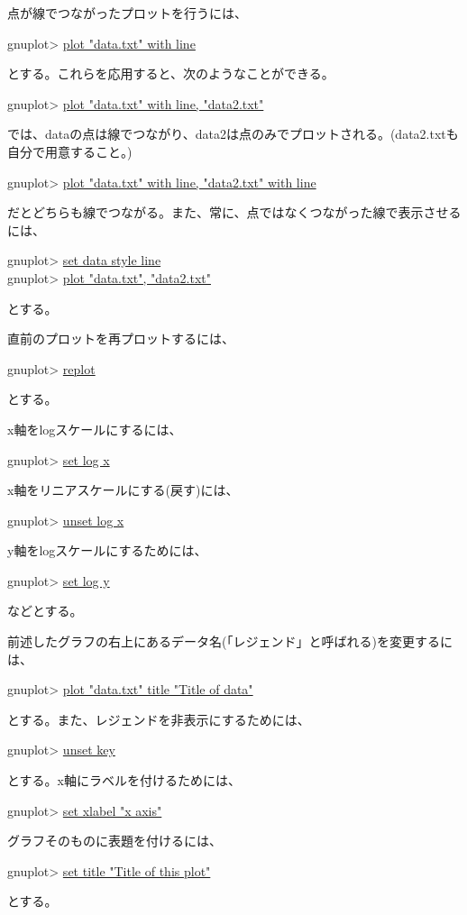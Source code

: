 {点が線でつながったプロットを行うには、
\begin{commandline2}
gnuplot> \underline{plot "data.txt" with line}
\end{commandline2} \noindent
とする。これらを応用すると、次のようなことができる。
\begin{commandline2}
gnuplot> \underline{plot "data.txt" with line, "data2.txt"}
\end{commandline2} \noindent
では、dataの点は線でつながり、data2は点のみでプロットされる。(data2.txtも自分で用意すること。)
\begin{commandline2}
gnuplot> \underline{plot "data.txt" with line, "data2.txt" with line}
\end{commandline2} \noindent
だとどちらも線でつながる。また、常に、点ではなくつながった線で表示させるには、
\begin{commandline2}
gnuplot> \underline{set data style line}\\
gnuplot> \underline{plot "data.txt", "data2.txt"}
\end{commandline2} \noindent
とする。

直前のプロットを再プロットするには、
\begin{commandline2}
gnuplot> \underline{replot}
\end{commandline2} \noindent
とする。

x軸をlogスケールにするには、
\begin{commandline2}
gnuplot> \underline{set log x}
\end{commandline2} \noindent
x軸をリニアスケールにする(戻す)には、
\begin{commandline2}
gnuplot> \underline{unset log x}
\end{commandline2} \noindent
y軸をlogスケールにするためには、
\begin{commandline2}
gnuplot> \underline{set log y}
\end{commandline2} \noindent
などとする。

前述したグラフの右上にあるデータ名(「レジェンド」と呼ばれる)を変更するには、
\begin{commandline2}
gnuplot> \underline{plot "data.txt" title "Title of data"}
\end{commandline2} \noindent
とする。また、レジェンドを非表示にするためには、
\begin{commandline2}
gnuplot> \underline{unset key}
\end{commandline2} \noindent
とする。x軸にラベルを付けるためには、
\begin{commandline2}
gnuplot> \underline{set xlabel "x axis"}
\end{commandline2} \noindent
グラフそのものに表題を付けるには、
\begin{commandline2}
gnuplot> \underline{set title "Title of this plot"}
\end{commandline2} \noindent
とする。

}
